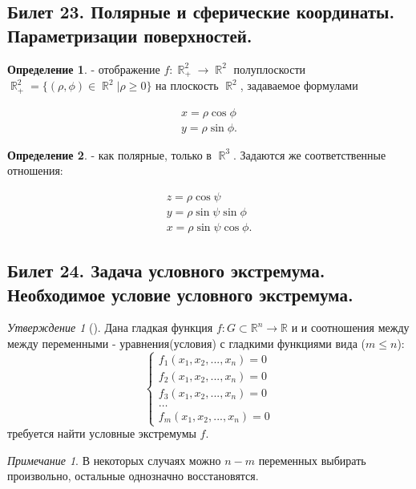 \documentclass[a4paper]{article}
\theoremstyle{indented}
\theoremstyle{definition}
\newtheorem{defn}{Определение}
\theoremstyle{remark}
\newtheorem{remark}{Примечание}
\newtheorem{stat}{Утверждение}
\DeclareMathOperator{\ra}{\rightarrow}
\DeclareMathOperator{\RR}{\mathbb{R}}
\newcommand{\bea}{\begin{eqnarray*}}
\newcommand{\eea}{\end{eqnarray*}}
\begin{document}
\subsection{Билет 23. Полярные и сферические координаты. Параметризации поверхностей.}%

\begin{defn}
     - отображение $f: \RR_+^2 \ra \RR^2$ полуплоскости $\RR_+^2 = \{(\rho, \phi) \in \RR^2| \rho \geq 0\}$ на плоскость $\RR^2$, задаваемое формулами 
    
    \bea
        x = \rho \cos \phi \\ 
        y = \rho \sin \phi.
    \eea
\end{defn}

\begin{defn}
     - как полярные, только в $\RR^3$. Задаются же соответственные отношения: 

    \bea
        z = \rho \cos \psi \\ 
        y = \rho \sin \psi \sin \phi \\ 
        x = \rho \sin \psi \cos \phi.
    \eea
\end{defn}

\subsection{Билет 24. Задача условного экстремума. Необходимое условие условного экстремума.}%


\begin{stat}[]
    Дана гладкая функция $f: G\subset\mathbb{R}^n \to \mathbb{R}$ и
    и соотношения между между переменными - уравнения(условия) с гладкими функциями 
    вида ($m \leq n$):
    \[
        \begin{cases}
            f_1(x_1, x_2, ... , x_n) = 0 \\
            f_2(x_1, x_2, ... , x_n) = 0 \\
            f_3(x_1, x_2, ... , x_n) = 0 \\
            \dots                        \\
            f_m(x_1, x_2, ... , x_n) = 0 
        \end{cases}  
    \]
    требуется найти условные экстремумы $f$.
\end{stat}

\begin{remark}
    В некоторых случаях можно $n-m$ переменных выбирать произвольно, остальные однозначно восстановятся.
\end{remark}
\end{document}
